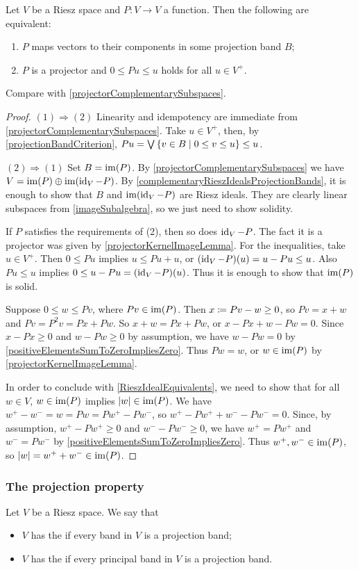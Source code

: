 \begin{proposition}
Let $V$ be a Riesz space and $P: V\to V$ a function. Then the following are equivalent:
\begin{enumerate}
\item $P$ maps vectors to their components in some projection band $B$;
\item $P$ is a projector and $0\leq Pu \leq u$ holds for all $u\in V^+$.
\end{enumerate}
\end{proposition}
Compare with \ref{projectorComplementarySubspaces}.
\begin{proof}
$(1) \Rightarrow (2)$ Linearity and idempotency are immediate from \ref{projectorComplementarySubspaces}. Take $u\in V^+$, then, by \ref{projectionBandCriterion}, $Pu = \bigvee \setbuilder{v\in B}{0\leq v\leq u} \leq u$.

$(2) \Rightarrow (1)$ Set $B = \operatorname{im}(P)$. By \ref{projectorComplementarySubspaces} we have $V = \operatorname{im}(P)\oplus \operatorname{im}(\operatorname{id}_V-P)$. By \ref{complementaryRieszIdealsProjectionBands}, it is enough to show that $B$ and $\operatorname{im}(\operatorname{id}_V-P)$ are Riesz ideals. They are clearly linear subspaces from \ref{imageSubalgebra}, so we just need to show solidity.

If $P$ satisfies the requirements of (2), then so does $\operatorname{id}_V-P$. The fact it is a projector was given by \ref{projectorKernelImageLemma}. For the inequalities, take $u\in V^+$. Then $0\leq Pu$ implies $u\leq Pu + u$, or $(\operatorname{id}_V-P)(u) = u-Pu \leq u$. Also $Pu \leq u$ implies $0\leq u - Pu = (\operatorname{id}_V - P)(u)$. Thus it is enough to show that $\operatorname{im}(P)$ is solid.

Suppose $0\leq w \leq Pv$, where $Pv\in \operatorname{im}(P)$. Then $x\coloneqq Pv - w \geq 0$, so $Pv = x+w$ and $Pv = P^2v = Px + Pw$. So $x+w = Px+Pw$, or $x-Px + w-Pw = 0$. Since $x-Px\geq 0$ and $w-Pw \geq 0$ by assumption, we have $w-Pw = 0$ by \ref{positiveElementsSumToZeroImpliesZero}. Thus $Pw = w$, or $w\in \operatorname{im}(P)$ by \ref{projectorKernelImageLemma}.

In order to conclude with \ref{RieszIdealEquivalents}, we need to show that for all $w\in V$, $w\in \operatorname{im}(P)$ implies $|w|\in \operatorname{im}(P)$. We have $w^+ - w^- = w =Pw = Pw^+ - Pw^-$, so $w^+ - Pw^+ + w^- - Pw^- = 0$. Since, by assumption, $w^+ - Pw^+ \geq 0$ and $w^- - Pw^- \geq 0$, we have $w^+  = Pw^+$ and $w^- = Pw^-$ by \ref{positiveElementsSumToZeroImpliesZero}. Thus $w^+, w^-\in\operatorname{im}(P)$, so $|w| = w^++w^- \in \operatorname{im}(P)$.
\end{proof}

\subsubsection{The projection property}
\begin{definition}
Let $V$ be a Riesz space. We say that
\begin{itemize}
\item $V$ has the  if every band in $V$ is a projection band;
\item $V$ has the  if every principal band in $V$ is a projection band.
\end{itemize}
\end{definition}

